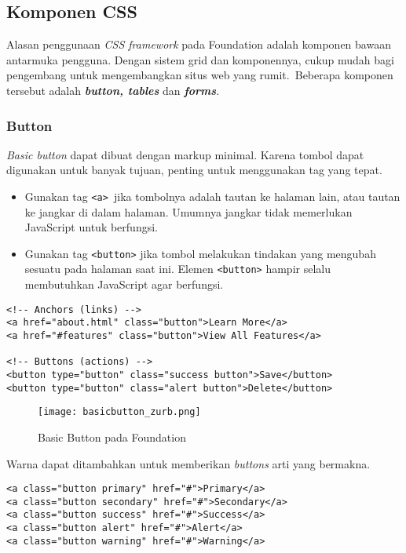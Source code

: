 \subsection{Komponen CSS}
\label{subs:css_zurb}
Alasan penggunaan \textit{CSS framework} pada Foundation adalah komponen bawaan antarmuka pengguna. Dengan sistem grid dan komponennya, cukup mudah bagi pengembang untuk mengembangkan situs web yang rumit.~\cite{zurb:15:introfoundation}Beberapa komponen tersebut adalah \textit{\textbf{button, tables}} dan \textit{\textbf{forms}}.\cite{zurbfoundation:17}

\subsubsection{Button}
\label{sssec:css_1}
\textit{Basic button} dapat dibuat dengan markup minimal. Karena tombol dapat digunakan untuk banyak tujuan, penting untuk menggunakan tag yang tepat.
\begin{itemize}
  \item Gunakan tag \texttt{<a> }jika tombolnya adalah tautan ke halaman lain, atau tautan ke jangkar di dalam halaman. Umumnya jangkar tidak memerlukan JavaScript untuk berfungsi.
  \item Gunakan tag \texttt{<button>} jika tombol melakukan tindakan yang mengubah sesuatu pada halaman saat ini. Elemen \texttt{<button>} hampir selalu membutuhkan JavaScript agar berfungsi. \cite{zurbfoundation:17}
\end{itemize}\cite{zurbfoundation:17}

\begin{lstlisting}[frame=single] 
<!-- Anchors (links) -->
<a href="about.html" class="button">Learn More</a>
<a href="#features" class="button">View All Features</a>

<!-- Buttons (actions) -->
<button type="button" class="success button">Save</button>
<button type="button" class="alert button">Delete</button>
\end{lstlisting}

\begin{figure} [H]
	\centering  
	\texttt{[image: basicbutton\_zurb.png]}  
	\caption{Basic Button pada Foundation}
	\label{fig:gridbasic_zurb} 
\end{figure}

Warna dapat ditambahkan untuk memberikan \textit{buttons} arti yang bermakna.
\begin{lstlisting}[frame=single] 
<a class="button primary" href="#">Primary</a>
<a class="button secondary" href="#">Secondary</a>
<a class="button success" href="#">Success</a>
<a class="button alert" href="#">Alert</a>
<a class="button warning" href="#">Warning</a>
\end{lstlisting}

